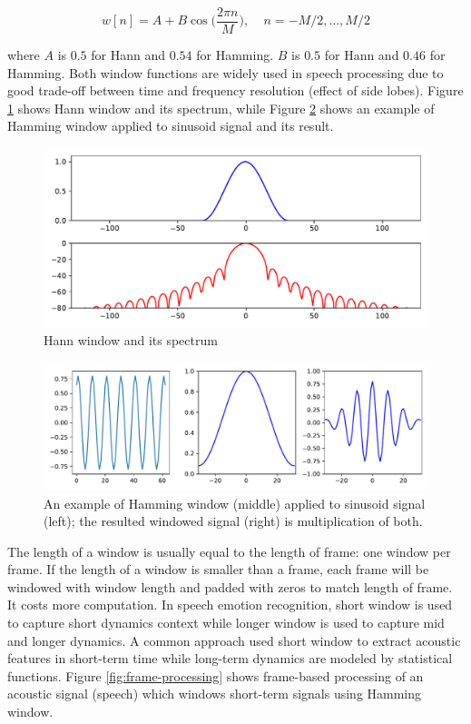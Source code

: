 \begin{equation}
  w[n] = A + B \cos \biggl(\frac {2\pi n}{M}\biggl), ~~~~~n = -M/2, \ldots, M/2
\end{equation}

\noindent where $A$ is $0.5$ for Hann and $0.54$ for Hamming. $B$ is $0.5$ for
Hann and $0.46$ for Hamming. Both window functions are widely used in speech
processing due to good trade-off between time and frequency resolution (effect
of side lobes). Figure \ref{fig:window_hann} shows Hann window and its spectrum,
while Figure \ref{fig:windowing_demo} shows an example of Hamming window applied
to sinusoid signal and its result.

\begin{figure}[htbp]
  \centering
  \includegraphics[width=\textwidth]{../fig/window_hann.pdf}
  \caption{Hann window and its spectrum}
  \label{fig:window_hann}
\end{figure}

\begin{figure}[htbp]
  \centering
  \includegraphics[width=\textwidth]{../fig/windowing_demo.pdf}
  \caption{An example of Hamming window (middle) applied to sinusoid signal (left); the resulted windowed signal (right) is multiplication of both.}
  \label{fig:windowing_demo}

\end{figure}
The length of a window is usually equal to the length of frame: one window per
frame. If the length of a window is smaller than a frame, each frame will be
windowed with window length and padded with zeros to match length of frame. It
costs more computation. In speech emotion recognition, short window is used to
capture short dynamics context while longer window is used to capture mid and
longer dynamics. A common approach used short window to extract acoustic
features in short-term time while long-term dynamics are modeled by statistical 
functions. Figure \ref{fig:frame-processing} shows frame-based processing of an
acoustic signal (speech) which windows short-term signals using Hamming window.

